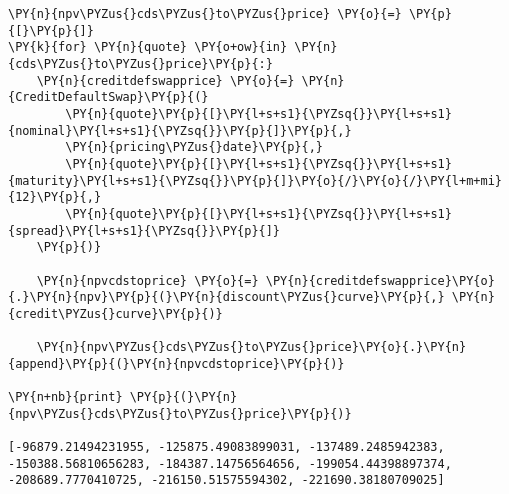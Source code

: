 \begin{Answer}
\begin{codebox}[size=fbox, boxrule=1pt,colback=cellbackground, colframe=cellborder]
\begin{Verbatim}[commandchars=\\\{\}]
\end{Verbatim}
\end{codebox}

\begin{codebox}[size=fbox, boxrule=1pt,colback=cellbackground, colframe=cellborder]
\begin{Verbatim}[commandchars=\\\{\}]
\PY{n}{npv\PYZus{}cds\PYZus{}to\PYZus{}price} \PY{o}{=} \PY{p}{[}\PY{p}{]}
\PY{k}{for} \PY{n}{quote} \PY{o+ow}{in} \PY{n}{cds\PYZus{}to\PYZus{}price}\PY{p}{:}
    \PY{n}{creditdefswapprice} \PY{o}{=} \PY{n}{CreditDefaultSwap}\PY{p}{(}
        \PY{n}{quote}\PY{p}{[}\PY{l+s+s1}{\PYZsq{}}\PY{l+s+s1}{nominal}\PY{l+s+s1}{\PYZsq{}}\PY{p}{]}\PY{p}{,}              
        \PY{n}{pricing\PYZus{}date}\PY{p}{,}
        \PY{n}{quote}\PY{p}{[}\PY{l+s+s1}{\PYZsq{}}\PY{l+s+s1}{maturity}\PY{l+s+s1}{\PYZsq{}}\PY{p}{]}\PY{o}{/}\PY{o}{/}\PY{l+m+mi}{12}\PY{p}{,}
        \PY{n}{quote}\PY{p}{[}\PY{l+s+s1}{\PYZsq{}}\PY{l+s+s1}{spread}\PY{l+s+s1}{\PYZsq{}}\PY{p}{]}   
    \PY{p}{)}

    \PY{n}{npvcdstoprice} \PY{o}{=} \PY{n}{creditdefswapprice}\PY{o}{.}\PY{n}{npv}\PY{p}{(}\PY{n}{discount\PYZus{}curve}\PY{p}{,} \PY{n}{credit\PYZus{}curve}\PY{p}{)}
    
    \PY{n}{npv\PYZus{}cds\PYZus{}to\PYZus{}price}\PY{o}{.}\PY{n}{append}\PY{p}{(}\PY{n}{npvcdstoprice}\PY{p}{)}

\PY{n+nb}{print} \PY{p}{(}\PY{n}{npv\PYZus{}cds\PYZus{}to\PYZus{}price}\PY{p}{)}

[-96879.21494231955, -125875.49083899031, -137489.2485942383,
-150388.56810656283, -184387.14756564656, -199054.44398897374,
-208689.7770410725, -216150.51575594302, -221690.38180709025]
    \end{Verbatim}
\end{codebox}
\end{Answer}
